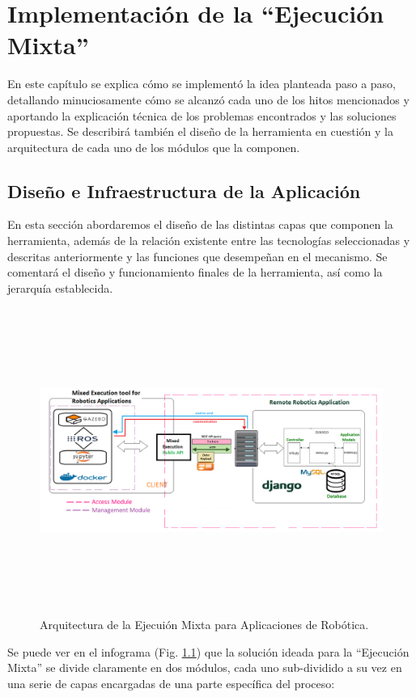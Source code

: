 \chapter{Implementación de la ``Ejecución Mixta''}
En este capítulo se explica cómo se implementó la idea planteada paso a paso, detallando minuciosamente cómo se alcanzó cada uno de los hitos mencionados y aportando la explicación técnica de los problemas encontrados y las soluciones propuestas. Se describirá también el diseño de la herramienta en cuestión y la arquitectura de cada uno de los módulos que la componen.

\section{Diseño e Infraestructura de la Aplicación}

En esta sección abordaremos el diseño de las distintas capas que componen la herramienta, además de la relación existente entre las tecnologías seleccionadas y descritas anteriormente y las funciones que desempeñan en el mecanismo. Se comentará el diseño y funcionamiento finales de la herramienta, así como la jerarquía establecida.

\begin{figure}[!ht]  \centering\noindent
    \includegraphics[width=1.20\textwidth,height=10cm]{figures/ejecucion-mixta-infograma.png}
    \caption{Arquitectura de la Ejecuión Mixta para Aplicaciones de Robótica.}
    \label{mixedexecarch}
\end{figure}

Se puede ver en el infograma (Fig. \ref{mixedexecarch}) que la solución ideada para la ``Ejecución Mixta'' se divide claramente en dos módulos, cada uno sub-dividido a su vez en una serie de capas encargadas de una parte específica del proceso:

